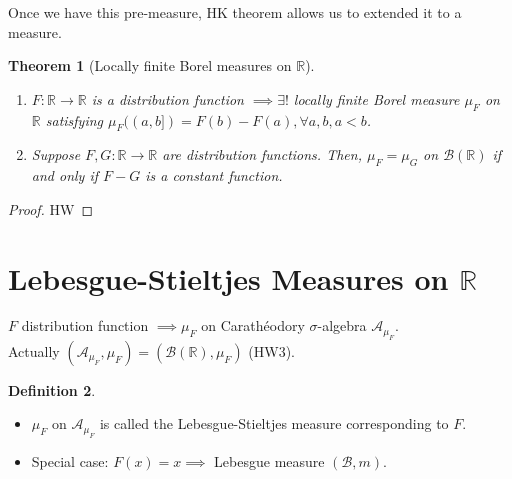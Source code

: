 \documentclass{report}
\newcommand{\R}{\mathbb{R}}
\newtheorem{theorem}{Theorem}[chapter]
\theoremstyle{definition}
\newtheorem{definition}[theorem]{Definition}
\theoremstyle{remark}
\newcommand{\fnl}{\parbox[t]{0\linewidth}{}}
\newcommand*\ttlmath[2]{\texorpdfstring{$\boldsymbol{#1}$}{#2}}
\begin{document}
Once we have this pre-measure, HK theorem allows us to extended it to a measure.

\begin{theorem}[Locally finite Borel measures on $\R$]\fnl
\begin{enumerate}
\item $F: \R \to \R$ is a distribution function $\implies \exists!$ locally finite Borel measure $\mu_F$ on $\R$ satisfying $\mu_F((a, b]) = F(b) - F(a), \forall a, b, a < b$.
\item Suppose $F, G: \R \to \R$ are distribution functions. Then, $\mu_F = \mu_G$ on $\mathcal{B}(\R)$ if and only if $F - G$ is a constant function.
\end{enumerate}
\end{theorem}
\begin{proof}
HW
\end{proof}

\section{Lebesgue-Stieltjes Measures on \ttlmath{\R}{Reals}}
$F$ distribution function  $\implies \mu_F$ on Carathéodory $\sigma$-algebra $\mathcal{A}_{\mu_F}$.\\
Actually $(\mathcal{A}_{\mu_F}, \mu_F) = (\mathcal{B}(\R), \mu_F)$ (HW3).

\begin{definition}
\begin{itemize}
\item $\mu_F$ on $\mathcal{A}_{\mu_F}$ is called the Lebesgue-Stieltjes measure corresponding to $F$.
\item Special case: $F(x) = x \implies$ Lebesgue measure $(\mathcal{B}, m)$.
\end{itemize}
\end{definition} 
\end{document}
